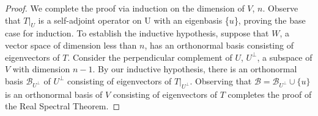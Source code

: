 \documentclass[letterpaper,12pt]{article}
\begin{document}
\begin{proof}
We complete the proof via induction on the dimension of $V$, $n$. Observe that $T|_{U}$ is a self-adjoint operator on U with an eigenbasis \{$u$\}, proving the base case for induction. To establish the inductive hypothesis, suppose that $W$, a vector space of dimension less than $n$, has an orthonormal basis consisting of eigenvectors of $T$. Consider the perpendicular complement of $U$, $U^{\perp}$, a subspace of $V$ with dimension $n-1$. By our inductive hypothesis, there is an orthonormal basis $\mathcal{B}_{U^{\perp}}$ of $U^{\perp}$ consisting of eigenvectors of $T|_{U^{\perp}}$. Observing that 
$\mathcal{B} = \mathcal{B}_{U^{\perp}} \cup \{u\}$ 
is an orthonormal basis of $V$ consisting of eigenvectors of $T$ completes the proof of the Real Spectral Theorem.
\end{proof}
\end{document}
